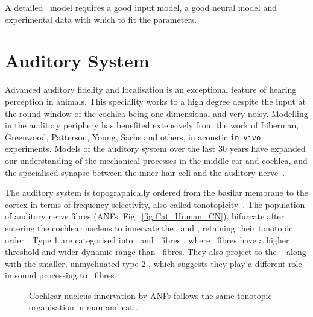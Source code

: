 
A detailed \BNN~model requires a good input model, a good neural model and experimental data with which to fit the parameters.

\section{Auditory System    \label{sec:CN:auditory-model}}

Advanced auditory fidelity and localisation is an exceptional feature of hearing perception in animals.
This speciality works to a high degree despite the input at the round window of the cochlea being one dimensional and very noisy.
Modelling in the auditory periphery has benefited extensively from the work of Liberman, Greenwood, Patterson, Young, Sachs and others, in acoustic \texttt{in vivo} experiments.
Models of the auditory system over the last 30 years have expanded our understanding of the mechanical processes in the middle ear and cochlea, and the specialised synapse between the inner hair cell and the auditory nerve~\citep{DavisVoigt:1991,Carney:1993,MeddisHewittEtAl:1990}.


The auditory system is topographically ordered from the basilar membrane to the cortex in terms of frequency selectivity, also called tonotopicity~\citep{YoungOertel:2004}.
The population of auditory nerve fibres (ANFs, Fig.~\ref{fig:Cat_Human_CN}), bifurcate after entering the cochlear nucleus to innervate the \VCN~and \DCN, retaining their tonotopic order \citep{Lorente:1981,Liberman:1982,Liberman:1993}.
Type 1 \ANFs are categorised into {\HSR}~and {\LSR}~fibres \citep{Liberman:1978}, where \LSR~fibres have a higher threshold and wider dynamic range than \HSR~fibres.
They also project to the \GCD~\citep{RyugoParks:2003, RyugoHaenggeliEtAl:2003} along with the smaller, unmyelinated type 2 \ANFs, which suggests they play a different role in sound processing to \HSR~fibres.


\begin{figure}[htb]
  \begin{center}
    \caption[Tonotopic innervation by ANFs in the CN of man and cat.]{Cochlear nucleus innervation by ANFs follows the same tonotopic organisation in man and cat
\citep[!find out which publication printed this!]{RyugoParks:2003,Ryugo:1992,Spoendlin:1973}.}
    \label{fig:CN_Cat_Human}
  \end{center}
\end{figure}



